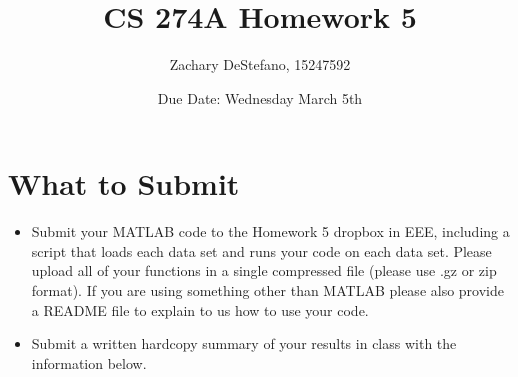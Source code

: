 \documentclass[11pt,psfig]{article}
\begin{document}
\setlength{\parskip}{1.2ex plus0.3ex minus 0.3ex}


\thispagestyle{empty} \pagestyle{myheadings} 



\title{CS 274A Homework 5}
\author{Zachary DeStefano, 15247592}
\date{Due Date: Wednesday March 5th}

\maketitle

 \newpage

\section*{What to Submit}

 
\begin{itemize} \item Submit your MATLAB  code to the
Homework 5 dropbox in EEE, including a script that loads each data set and runs your code on each data set. Please upload all of your functions in a single compressed
file (please use .gz or zip format). If you are using something other than MATLAB please also provide a README file to explain to us how to use your code.

\item Submit a written hardcopy summary of your results in class with the information below.
\end{itemize}
\end{document}
